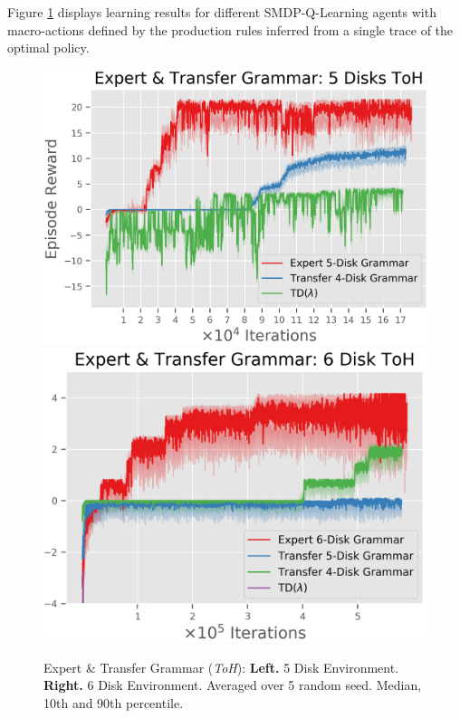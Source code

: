 \documentclass[10pt,letterpaper]{article}
\begin{document}
Figure \ref{fig:expert_grammar_toh} displays learning results for different SMDP-Q-Learning agents with macro-actions defined by the production rules inferred from a single trace of the optimal policy. 
\begin{figure}[H]
  \includegraphics[width=\linewidth]{figures/hanoi_5_learning_curve}
\endminipage\hfill
{}
  \includegraphics[width=\linewidth]{figures/hanoi_6_learning_curve}
\endminipage\hfill
\caption{Expert \& Transfer Grammar (\textit{ToH}): \textbf{Left.} 5 Disk Environment. \textbf{Right.} 6 Disk Environment. Averaged over 5 random seed. Median, 10th and 90th percentile.}
\label{fig:expert_grammar_toh}
\end{figure}
\end{document}

